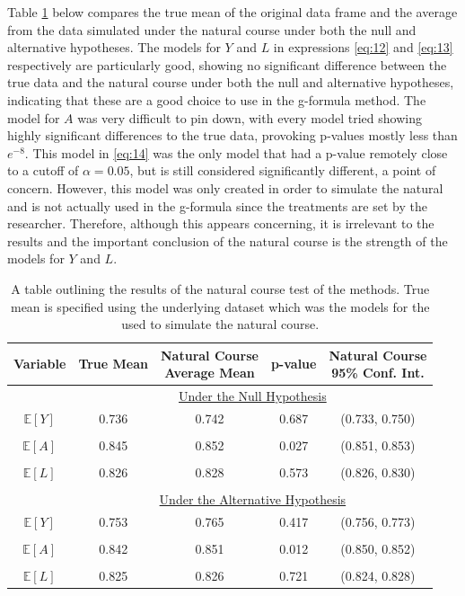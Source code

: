 Table \ref{naturalcourse} below compares the true mean of the original data frame and the average from the data simulated under the natural course under both the null and alternative hypotheses.  The models for $Y$ and $L$ in expressions \ref{eq:12} and \ref{eq:13} respectively are particularly good, showing no significant difference between the true data and the natural course under both the null and alternative hypotheses, indicating that these are a good choice to use in the g-formula method.  The model for $A$ was very difficult to pin down, with every model tried showing highly significant differences to the true data, provoking p-values mostly less than $e^{-8}$.  This model in \ref{eq:14} was the only model that had a p-value remotely close to a cutoff of $\alpha = 0.05$, but is still considered significantly different, a point of concern.  However, this model was only created in order to simulate the natural and is not actually used in the g-formula since the treatments are set by the researcher.  Therefore, although this appears concerning, it is irrelevant to the results and the important conclusion of the natural course is the strength of the models for $Y$ and $L$.  


\begin{table}[h!]
\centering
\begin{tabular}{c | c c c c}
Variable & True Mean & \shortstack{Natural Course\\ Average Mean} & p-value & \shortstack{Natural Course \\95\% Conf. Int.} \\ 
\hline 
& \multicolumn{4}{c}{\underline{Under the Null Hypothesis}} \\
$\mathbb{E}[Y]$ & 0.736 & 0.742 & 0.687 &(0.733, 0.750) \\ \\
$\mathbb{E}[A]$ & 0.845 & 0.852 & 0.027 &(0.851, 0.853) \\ \\
$\mathbb{E}[L]$ & 0.826 & 0.828 & 0.573 & (0.826, 0.830) \\ \\ 
& \multicolumn{4}{c}{\underline{Under the Alternative Hypothesis}} \\
$\mathbb{E}[Y]$ & 0.753 & 0.765 &0.417 &(0.756, 0.773) \\ \\
$\mathbb{E}[A]$ & 0.842 & 0.851 &0.012 &(0.850, 0.852) \\ \\
$\mathbb{E}[L]$ & 0.825 & 0.826 & 0.721 & (0.824, 0.828) 
\end{tabular} \\
\centering
\caption[Natural course of the g-formula simulation]{A table outlining the results of the natural course test of the methods.  True mean is specified using the underlying dataset which was the models for the used to simulate the natural course. \label{naturalcourse}}
\end{table}



